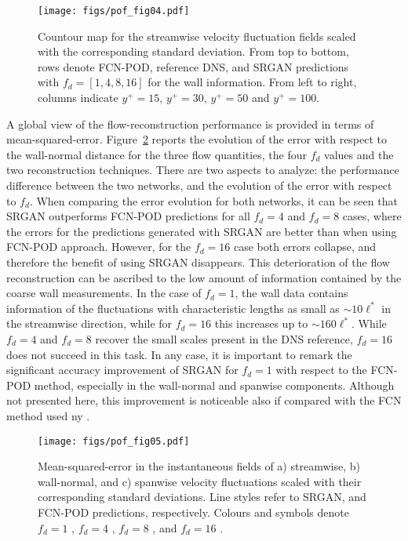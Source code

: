 \begin{figure}
  \centerline{\texttt{[image: figs/pof\_fig04.pdf]}}
  \caption{Countour map for the streamwise velocity fluctuation fields scaled with the corresponding standard deviation. From top to bottom, rows denote FCN-POD, reference DNS, and SRGAN predictions with $f_d=[1,4,8,16]$ for the wall information. From left to right, columns indicate $y^+=15$, $y^+=30$, $y^+=50$ and $y^+=100$.}
\label{fig:04}
\end{figure}

A global view of the flow-reconstruction performance is provided in terms of mean-squared-error.
Figure~\ref{fig:05} reports the evolution of the error with respect to the wall-normal distance for the three flow quantities, the four $f_d$ values and the two reconstruction techniques.
There are two aspects to analyze: the performance difference between the two networks, and the evolution of the error with respect to $f_d$. %
When comparing the error evolution for both networks, it can be seen that SRGAN outperforms FCN-POD predictions for all $f_d=4$ and $f_d=8$ cases, where the errors for the predictions generated with SRGAN are better than when using FCN-POD approach.
However, for the $f_d=16$ case both errors collapse, and therefore the benefit of using SRGAN disappears.
This deterioration of the flow reconstruction can be ascribed to the low amount of information contained by the coarse wall measurements.
In the case of $f_d=1$, the wall data contains information of the fluctuations with characteristic lengths as small as $\sim10\ell^*$ in the streamwise direction, while for $f_d=16$ this increases up to $\sim160\ell^*$.
While $f_d=4$ and $f_d=8$ recover the small scales present in the DNS reference, $f_d=16$ does not succeed in this task.
In any case, it is important to remark the significant accuracy improvement of SRGAN for $f_d=1$ with respect to the FCN-POD method, especially in the wall-normal and spanwise components.
Although not presented here, this improvement is noticeable also if compared with the FCN method used ny \citet{guastoni2020convolutional}.

\begin{figure}
  \centerline{\texttt{[image: figs/pof\_fig05.pdf]}}
  \caption{Mean-squared-error in the instantaneous fields of a) streamwise, b) wall-normal, and c) spanwise velocity fluctuations scaled with their corresponding standard deviations. Line styles refer to  SRGAN, and  FCN-POD predictions, respectively. Colours and symbols denote $f_d=1$ , $f_d=4$ , $f_d=8$ , and $f_d=16$ .}
\label{fig:05}
\end{figure}

